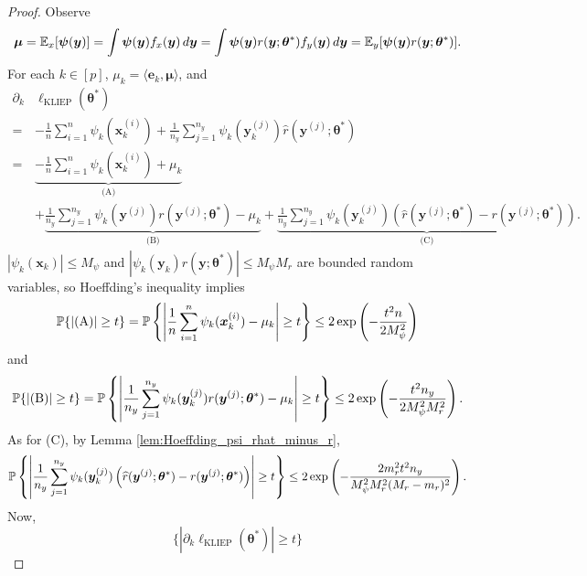 \documentclass[11pt]{article}
\numberwithin{equation}{section}
\numberwithin{theorem}{section}
\def\fate{\boldsymbol{e}}
\def\fatx{\boldsymbol{x}}
\def\faty{\boldsymbol{y}}
\def\fatmu{\boldsymbol{\mu}}
\def\fattheta{\boldsymbol{\theta}}
\def\fatpsi{\boldsymbol{\psi}}
\theoremstyle{definition}
\theoremstyle{remark}
\begin{document}
\begin{proof}
Observe
\begin{equation}
\fatmu
= \EE_x[ \fatpsi(\faty) ]
= \int \fatpsi(\faty) f_x(\faty) \, d\faty
= \int \fatpsi(\faty) r(\faty;\fattheta^*) f_y(\faty) \, d\faty
= \EE_y[ \fatpsi(\faty) r(\faty;\fattheta^*) ].
\end{equation}
For each $k \in [p]$, $\mu_k = \langle \fate_k, \fatmu \rangle$, and
\begin{equation}
\begin{aligned}
\partial_k & \ell_\text{KLIEP}(\fattheta^*) \\
=&-\frac{1}{n} \sum_{i=1}^{n} \psi_k(\fatx_k^{(i)}) + \frac{1}{n_y} \sum_{j=1}^{n_y} \psi_k(\faty_k^{(j)}) \hat r(\faty^{(j)};\fattheta^*) \\
=& \underbrace{-\frac{1}{n} \sum_{i=1}^{n} \psi_k(\fatx_k^{(i)}) + \mu_k}_\text{(A)} \\
&+ \underbrace{\frac{1}{n_y}\sum_{j=1}^{n_y} \psi_k(\faty^{(j)}) r(\faty^{(j)};\fattheta^*) - \mu_k}_\text{(B)}
+ \underbrace{\frac{1}{n_y}\sum_{j=1}^{n_y} \psi_k(\faty_k^{(j)}) \left( \hat r(\faty^{(j)};\fattheta^*) - r(\faty^{(j)};\fattheta^*) \right)}_\text{(C)}.
\end{aligned}
\end{equation}
$|\psi_k(\fatx_k)| \leq M_\psi$ and $|\psi_k(\faty_k) r(\faty;\fattheta^*)| \leq M_\psi M_r$ are bounded random variables, so Hoeffding's inequality implies
\begin{equation}
\PP\{ |\text{(A)}| \geq t \}
= \PP\left\{ \left| \frac{1}{n} \sum_{i=1}^{n} \psi_k(\fatx_k^{(i)}) - \mu_k \right| \geq t \right\}
\leq 2 \exp\left( -\frac{t^2 n}{2 M_\psi^2} \right)
\end{equation}
and
\begin{equation}
\PP\{ |\text{(B)}| \geq t \}
= \PP\left\{ \left| \frac{1}{n_y} \sum_{j=1}^{n_y} \psi_k(\faty_k^{(j)}) r(\faty^{(j)};\fattheta^*) - \mu_k \right| \geq t \right\}
\leq 2 \exp\left( -\frac{t^2 n_y}{2 M_\psi^2 M_r^2} \right).
\end{equation}
As for (C), by Lemma \ref{lem:Hoeffding_psi_rhat_minus_r},
\begin{equation}
\PP\left\{ \left| \frac{1}{n_y} \sum_{j=1}^{n_y} \psi_k(\faty_k^{(j)}) \left( \hat r(\faty^{(j)};\fattheta^*) - r(\faty^{(j)};\fattheta^*) \right) \right| \geq t \right\}
\leq 2\exp\left( -\frac{2 m_r^2 t^2 n_y}{M_\psi^2 M_r^2 (M_r - m_r)^2} \right).
\end{equation}
Now,
\begin{equation}
\{|\partial_k \ell_\text{KLIEP}(\fattheta^*)| \geq t\}

\end{equation}
\end{proof}
\end{document}
